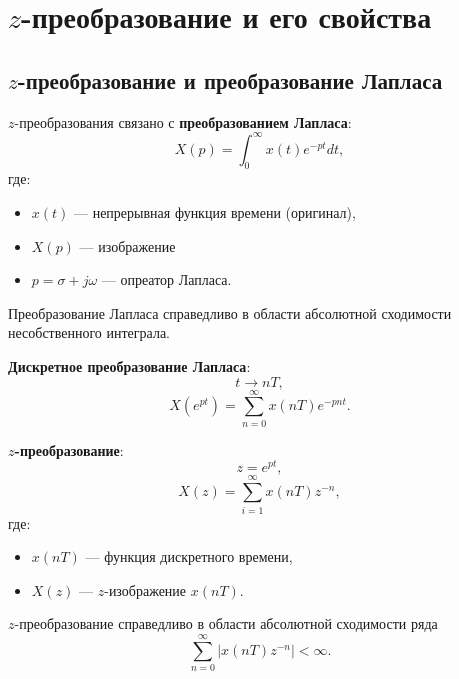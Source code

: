 \documentclass[a4paper, 14pt]{extarticle}
\begin{document}
\section{$z$-преобразование и его свойства}
\subsection{$z$-преобразование и преобразование Лапласа}
$z$-преобразования связано с \textbf{преобразованием Лапласа}:
\begin{equation}
    X(p) = \int_0^\infty x(t) e^{-pt} dt,
\end{equation}
где:
\begin{itemize}
    \item $x(t)$ --- непрерывная функция времени (оригинал),
    \item $X(p)$ --- изображение
    \item $p = \sigma + j \omega$ --- опреатор Лапласа.
\end{itemize}

Преобразование Лапласа справедливо в области абсолютной сходимости несобственного интеграла.

\textbf{Дискретное преобразование Лапласа}:
\begin{equation}
    t \to nT,
\end{equation}
\begin{equation}
    X(e^{pt}) = \sum^{\infty}_{n=0} x(nT) e^{-pnt}.
\end{equation}

\textbf{$z$-преобразование}:
\begin{equation}
    z = e^{pt},
\end{equation}
\begin{equation}
    X(z) = \sum^{\infty}_{i=1} x(nT) z^{-n},
\end{equation}
где:
\begin{itemize}
    \item $x(nT)$ --- функция дискретного времени,
    \item $X(z)$ --- $z$-изображение $x(nT)$.
\end{itemize}

$z$-преобразование справедливо в области абсолютной сходимости ряда
\begin{equation}
    \sum^{\infty}_{n=0} | x(nT) z^{-n} | < \infty.
\end{equation}
\end{document}
